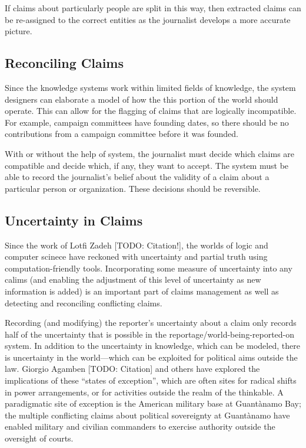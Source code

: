 \documentclass[format=siggraph, review=true]{acmart}
\begin{document}
If claims about particularly people are split in this way, then
extracted claims can be re-assigned to the correct entities as the
journalist develops a more accurate picture.


\subsection{Reconciling Claims}
Since the knowledge systems work within limited fields of knowledge,
the system designers can elaborate a model of how the this portion of
the world should operate. This can allow for the flagging of claims
that are logically incompatible. For example, campaign committees have
founding dates, so there should be no contributions from a campaign
committee before it was founded. 

With or without the help of system, the journalist must decide which
claims are compatible and decide which, if any, they want to
accept. The system must be able to record the journalist's belief about
the validity of a claim about a particular person or
organization. These decisions should be reversible.

\subsection{Uncertainty in Claims}
Since the work of Lotfi Zadeh [TODO: Citation!], the worlds of logic and computer scinece have reckoned with uncertainty and partial truth using computation-friendly tools. Incorporating some measure of uncertainty into any calims (and enabling the adjustment of this level of uncertainty as new information is added) is an important part of claims management as well as detecting and reconciling conflicting claims. 

Recording (and modifying) the reporter's uncertainty about a claim only records half of the uncertainty that is possible in the reportage/world-being-reported-on system. In addition to the uncertainty in knowledge, which can be modeled, there is uncertainty in the world—which can be exploited for political aims outside the law. Giorgio Agamben [TODO: Citation] and others have explored the implications of these ``states of exception'', which are often sites for radical shifts in power arrangements, or for activities outside the realm of the thinkable. A paradigmatic site of exception is the American military base at Guantànamo Bay; the multiple conflicting claims about political sovereignty at Guantànamo have enabled military and civilian commanders to exercise authority outside the oversight of courts. 
\end{document}
